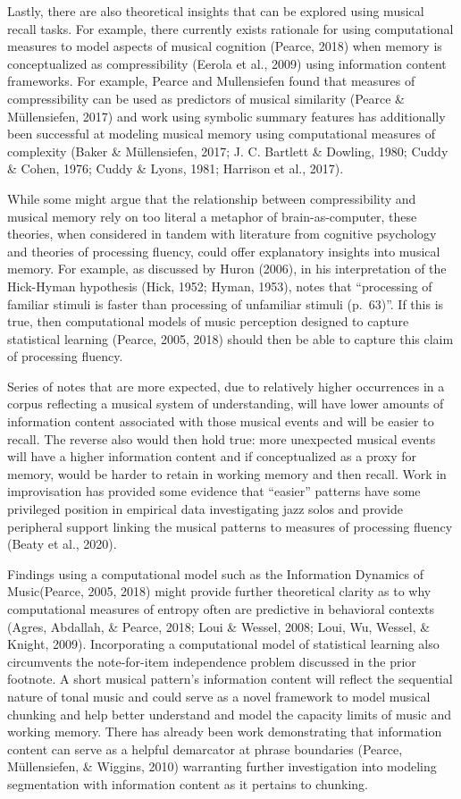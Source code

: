 \documentclass[english,man]{apa6}
\begin{document}
Lastly, there are also theoretical insights that can be explored using musical recall tasks. For example, there currently exists rationale for using computational measures to model aspects of musical cognition (Pearce, 2018) when memory is conceptualized as compressibility (Eerola et al., 2009) using information content frameworks.
For example, Pearce and Mullensiefen found that measures of compressibility can be used as predictors of musical similarity (Pearce \& Müllensiefen, 2017) and work using symbolic summary features has additionally been successful at modeling musical memory using computational measures of complexity (Baker \& Müllensiefen, 2017; J. C. Bartlett \& Dowling, 1980; Cuddy \& Cohen, 1976; Cuddy \& Lyons, 1981; Harrison et al., 2017).

While some might argue that the relationship between compressibility and musical memory rely on too literal a metaphor of brain-as-computer, these theories, when considered in tandem with literature from cognitive psychology and theories of processing fluency, could offer explanatory insights into musical memory.
For example, as discussed by Huron (2006), in his interpretation of the Hick-Hyman hypothesis (Hick, 1952; Hyman, 1953), notes that \enquote{processing of familiar stimuli is faster than processing of unfamiliar stimuli (p.~63)}.
If this is true, then computational models of music perception designed to capture statistical learning (Pearce, 2005, 2018) should then be able to capture this claim of processing fluency.

Series of notes that are more expected, due to relatively higher occurrences in a corpus reflecting a musical system of understanding, will have lower amounts of information content associated with those musical events and will be easier to recall. The reverse also would then hold true: more unexpected musical events will have a higher information content and if conceptualized as a proxy for memory, would be harder to retain in working memory and then recall. Work in improvisation has provided some evidence that \enquote{easier} patterns have some privileged position in empirical data investigating jazz solos and provide peripheral support linking the musical patterns to measures of processing fluency (Beaty et al., 2020).

Findings using a computational model such as the Information Dynamics of Music(Pearce, 2005, 2018) might provide further theoretical clarity as to why computational measures of entropy often are predictive in behavioral contexts (Agres, Abdallah, \& Pearce, 2018; Loui \& Wessel, 2008; Loui, Wu, Wessel, \& Knight, 2009).
Incorporating a computational model of statistical learning also circumvents the note-for-item independence problem discussed in the prior footnote.
A short musical pattern's information content will reflect the sequential nature of tonal music and could serve as a novel framework to model musical chunking and help better understand and model the capacity limits of music and working memory.
There has already been work demonstrating that information content can serve as a helpful demarcator at phrase boundaries (Pearce, Müllensiefen, \& Wiggins, 2010) warranting further investigation into modeling segmentation with information content as it pertains to chunking.
\end{document}
